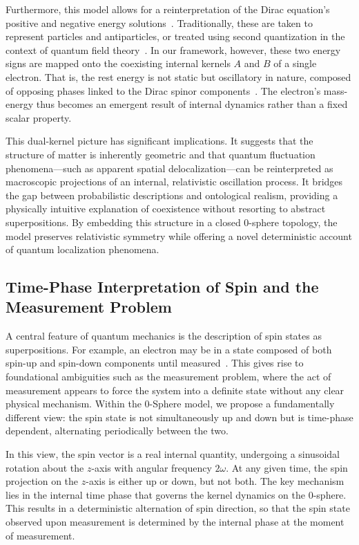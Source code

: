 \documentclass[%
 reprint,
 amsmath,amssymb,
 aps,
]{revtex4-1}
\numberwithin{equation}{section}%
\begin{document}
Furthermore, this model allows for a reinterpretation of the Dirac equation's positive and negative energy solutions~\cite{bjorken1964}. Traditionally, these are taken to represent particles and antiparticles, or treated using second quantization in the context of quantum field theory~\cite{greiner2000}. In our framework, however, these two energy signs are mapped onto the coexisting internal kernels $A$ and $B$ of a single electron. That is, the rest energy is not static but oscillatory in nature, composed of opposing phases linked to the Dirac spinor components~\cite{bjorken1964}. The electron’s mass-energy thus becomes an emergent result of internal dynamics rather than a fixed scalar property.

This dual-kernel picture has significant implications. It suggests that the structure of matter is inherently geometric and that quantum fluctuation phenomena—such as apparent spatial delocalization—can be reinterpreted as macroscopic projections of an internal, relativistic oscillation process. It bridges the gap between probabilistic descriptions and ontological realism, providing a physically intuitive explanation of coexistence without resorting to abstract superpositions. By embedding this structure in a closed 0-sphere topology, the model preserves relativistic symmetry while offering a novel deterministic account of quantum localization phenomena.


\subsection{Time-Phase Interpretation of Spin and the Measurement Problem}

A central feature of quantum mechanics is the description of spin states as superpositions. For example, an electron may be in a state composed of both spin-up and spin-down components until measured~\cite{uhlenbeck1925}. This gives rise to foundational ambiguities such as the measurement problem, where the act of measurement appears to force the system into a definite state without any clear physical mechanism. Within the 0-Sphere model, we propose a fundamentally different view: the spin state is not simultaneously up and down but is time-phase dependent, alternating periodically between the two.

In this view, the spin vector is a real internal quantity, undergoing a sinusoidal rotation about the \( z \)-axis with angular frequency \( 2\omega \). At any given time, the spin projection on the \( z \)-axis is either up or down, but not both. The key mechanism lies in the internal time phase that governs the kernel dynamics on the 0-sphere. This results in a deterministic alternation of spin direction, so that the spin state observed upon measurement is determined by the internal phase at the moment of measurement.
\end{document}
